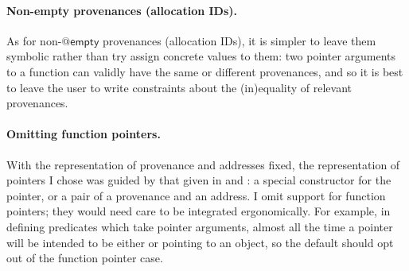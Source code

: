 
\paragraph{Non-empty provenances (allocation IDs).}%
As for non-$@\mathsf{empty}$ provenances (allocation IDs), it is simpler to
leave them symbolic rather than try assign concrete values to them: two pointer
arguments to a function can validly have the same or different provenances, and
so it is best to leave the user to write constraints about the (in)equality of %
relevant provenances.

\paragraph{Omitting function pointers.}%
With the representation of provenance and addresses fixed, the representation
of pointers I chose was guided by that given in  and :
a special constructor for the  pointer, or a pair of a
provenance and an address. I omit support for function pointers;
they would need care to be integrated ergonomically. For example, in defining
predicates which take pointer arguments, almost all the time a pointer will be
intended to be either  or pointing to an object, so
the default should opt out of the function pointer case.

